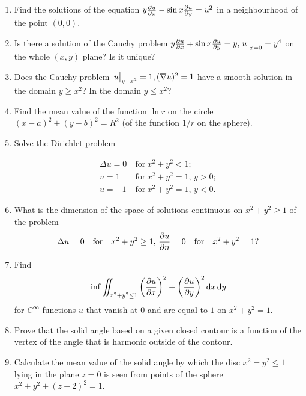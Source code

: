 \documentclass{article}
\begin{document}
\begin{enumerate}
\item Find the solutions of the equation $y \pdv{u}{x} - \sin x \pdv{u}{y} = u^2$ in a neighbourhood of the point $(0, 0)$.

\item Is there a solution of the Cauchy problem $y \pdv{u}{x} + \sin x \pdv{u}{y} = y, \eval{u}_{x = 0} = y^4$ on the whole $(x, y)$ plane? Is it unique?

\item Does the Cauchy problem $\eval{u}_{y = x^2} = 1, (\nabla u)^2 = 1$ have a smooth solution in the domain $y \geq x^2$? In the domain $y \leq x^2$?

\item Find the mean value of the function $\ln r$ on the circle $(x-a)^2 + (y-b)^2 = R^2$ (of the function $1/r$ on the sphere).

\item Solve the Dirichlet problem

  \begin{align*}
    \Delta u = 0\ &\textrm{for}\ x^2 + y^2 < 1; \\
    u = 1\ &\textrm{for}\ x^2 + y^2 = 1, \, y > 0; \\
    u = -1\ &\textrm{for}\ x^2 + y^2 = 1, \, y < 0.
  \end{align*}

\item What is the dimension of the space of solutions continuous on $x^2 + y^2 \geq 1$ of the problem
  \begin{equation*}
    \Delta u = 0 \quad \textrm{for} \quad x^2 + y^2 \ge 1, \, \pdv{u}{n} = 0 \quad \textrm{for} \quad x^2 + y^2 = 1 ?
  \end{equation*}

\item Find
  \begin{equation*}
    \inf \iint_{x^2+y^2 \leq 1} \qty(\pdv{u}{x})^2 + \qty(\pdv{u}{y})^2 \dd{x}\dd{y}
  \end{equation*}
  for $C^\infty$-functions $u$ that vanish at $0$ and are equal to $1$ on $x^2 + y^2 = 1$.

\item Prove that the solid angle based on a given closed contour is a function of the vertex of the angle that is harmonic outside of the contour.

\item Calculate the mean value of the solid angle by which the disc $x^2 = y^2 \leq 1$ lying in the plane $z = 0$ is seen from points of the sphere $x^2 + y^2 + (z-2)^2 = 1$.


\end{enumerate}
\end{document}
